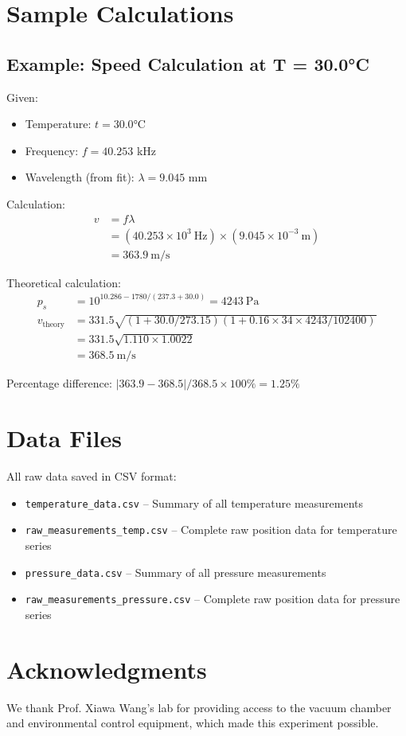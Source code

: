 \documentclass[12pt]{article}
\begin{document}
\section{Sample Calculations}

\subsection{Example: Speed Calculation at T = 30.0°C}

Given:
\begin{itemize}
    \item Temperature: $t = 30.0$°C
    \item Frequency: $f = 40.253$ \si{\kilo\hertz}
    \item Wavelength (from fit): $\lambda = 9.045$ \si{\milli\meter}
\end{itemize}

Calculation:
\begin{align}
v &= f \lambda \\
&= (40.253 \times 10^3~\si{\hertz}) \times (9.045 \times 10^{-3}~\si{\meter}) \\
&= 363.9~\si{\meter\per\second}
\end{align}

Theoretical calculation:
\begin{align}
p_s &= 10^{10.286 - 1780/(237.3 + 30.0)} = 4243~\si{\pascal} \\
v_{\text{theory}} &= 331.5 \sqrt{(1 + 30.0/273.15)(1 + 0.16 \times 34 \times 4243/102400)} \\
&= 331.5 \sqrt{1.110 \times 1.0022} \\
&= 368.5~\si{\meter\per\second}
\end{align}

Percentage difference: $|363.9 - 368.5|/368.5 \times 100\% = 1.25\%$

\section{Data Files}

All raw data saved in CSV format:
\begin{itemize}
    \item \texttt{temperature\_data.csv} -- Summary of all temperature measurements
    \item \texttt{raw\_measurements\_temp.csv} -- Complete raw position data for temperature series
    \item \texttt{pressure\_data.csv} -- Summary of all pressure measurements
    \item \texttt{raw\_measurements\_pressure.csv} -- Complete raw position data for pressure series
\end{itemize}

\section{Acknowledgments}

We thank Prof. Xiawa Wang's lab for providing access to the vacuum chamber and environmental control equipment, which made this experiment possible.
\end{document}
